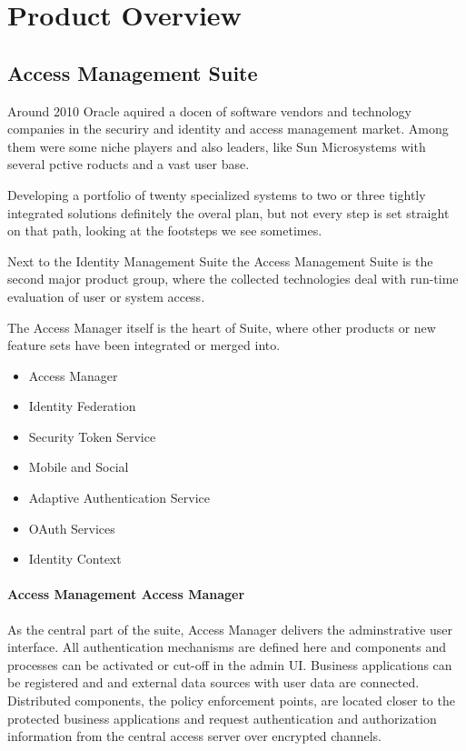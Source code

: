 
\chapter[Product Overview]{Product Overview}

\section{Access Management Suite}

Around 2010 Oracle aquired a docen of software vendors and technology companies in the securiry and identity and access management market. Among them were some niche players and also leaders, like Sun Microsystems with several pctive roducts and a vast user base.

Developing a portfolio of twenty specialized systems to two or three tightly integrated solutions definitely the overal plan, but not every step is set straight on that path, looking at the footsteps we see sometimes.

Next to the Identity Management Suite the Access Management Suite is the second major product group, where the collected technologies deal with run-time evaluation of user or system access.

The Access Manager itself is the heart of Suite, where other products or new feature sets have been integrated or merged into.

\begin{itemize}
    \item Access Manager
    \item Identity Federation
    \item Security Token Service
    \item Mobile and Social
    \item Adaptive Authentication Service
    \item OAuth Services
    \item Identity Context
\end{itemize}

\subsubsection{Access Management Access Manager}

As the central part of the suite, Access Manager delivers the adminstrative user interface. All authentication mechanisms are defined here and components and processes can be activated or cut-off in the admin UI. Business applications can be registered and and external data sources with user data are connected.
Distributed components, the policy enforcement points, are located closer to the protected business applications and request authentication and authorization information from the central access server over encrypted channels.


